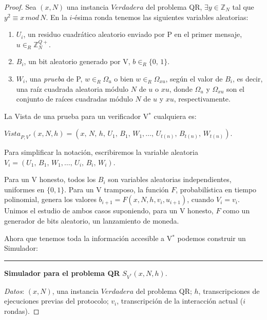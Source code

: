 \begin{proof}
	Sea $(x,N)$ una instancia $Verdadera$ del problema QR, $\exists y\in \mathbb{Z}_N$ tal que $y^2\equiv x \, mod \, N$. En la $i$-ésima ronda tenemos las siguientes variables aleatorias:
	
	\begin{enumerate}
		\item $U_i$, un residuo cuadrático aleatorio enviado por P en el primer mensaje, $u \in_R \mathbb{Z}^{Q+}_N$.
		
		\item $B_i$, un bit aleatorio generado por V, $b \in_R \{0,\,1\}$.
		
		\item $W_i$, una \textit{prueba} de P, $w \in_R \Omega_u$ o bien $w \in_R \Omega_{xu}$, según el valor de $B_i$, es decir, una raíz cuadrada aleatoria módulo $N$ de $u$ o $xu$, donde $\Omega_u$ y $ \Omega_{xu}$ son el conjunto de raíces cuadradas módulo $N$ de $u$ y $xu$, respectivamente.
	\end{enumerate}
	
	\hfil
	
	La Vista de una prueba para un verificador V$^*$ cualquiera es:
	
	\begin{center}
		$Vista_{P,V^*}(x,N,h) = (x,\,N,\,h,\,U_1,\,B_1,\,W_1, \dots ,\,U_{t(n)},\,B_{t(n)},\,W_{t(n)})$.
	\end{center}
	
	
	Para simplificar la notación, escribiremos la variable aleatoria $V_i=(U_1,\,B_1,\,W_1, \dots ,\,U_i,\,B_i,\,W_i)$.
	
	Para un V honesto, todos los $B_i$ son variables aleatorias independientes, uniformes en $\{0,1\}$. Para un V tramposo, la función $F$, probabilística en tiempo polinomial, genera los valores $b_{i+1} = F(x,N,h,v_i,u_{i+1})$, cuando $V_i = v_i$. Unimos el estudio de ambos casos suponiendo, para un V honesto, $F$ como un generador de bits aleatorio, un lanzamiento de moneda.
	
	Ahora que tenemos toda la información accesible a V$^*$ podemos construir un Simulador:
	
	\hfil 
	
	\rule{\textwidth}{1pt}
	
	\textbf{Simulador para el problema QR} $S_{V^*}(x,N,h)$.
	
	\hfil
	
	\textit{Datos}: \quad $(x,N)$, una instancia $Verdadera$ del problema QR; \quad $h$, transcripciones de ejecuciones previas del protocolo; \quad $v_i$, transcripción de la interacción actual ($i$ rondas).
	

\end{proof}
